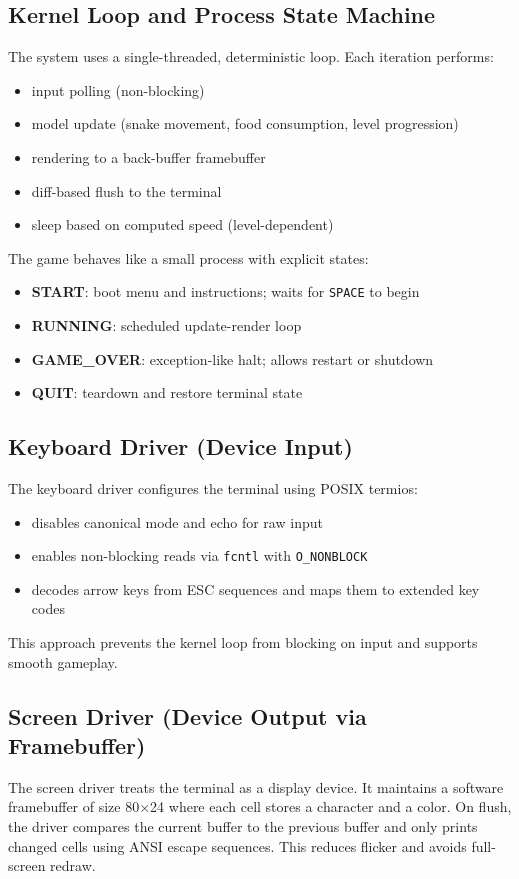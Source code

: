 \documentclass[conference]{IEEEtran}
\begin{document}
\subsection{Kernel Loop and Process State Machine}
The system uses a single-threaded, deterministic loop. Each iteration performs:
\begin{itemize}
    \item input polling (non-blocking)
    \item model update (snake movement, food consumption, level progression)
    \item rendering to a back-buffer framebuffer
    \item diff-based flush to the terminal
    \item sleep based on computed speed (level-dependent)
\end{itemize}

The game behaves like a small process with explicit states:
\begin{itemize}
    \item \textbf{START}: boot menu and instructions; waits for \texttt{SPACE} to begin
    \item \textbf{RUNNING}: scheduled update-render loop
    \item \textbf{GAME\_OVER}: exception-like halt; allows restart or shutdown
    \item \textbf{QUIT}: teardown and restore terminal state
\end{itemize}

\subsection{Keyboard Driver (Device Input)}
The keyboard driver configures the terminal using POSIX termios:
\begin{itemize}
    \item disables canonical mode and echo for raw input
    \item enables non-blocking reads via \texttt{fcntl} with \texttt{O\_NONBLOCK}
    \item decodes arrow keys from ESC sequences and maps them to extended key codes
\end{itemize}
This approach prevents the kernel loop from blocking on input and supports smooth gameplay.

\subsection{Screen Driver (Device Output via Framebuffer)}
The screen driver treats the terminal as a display device. It maintains a software framebuffer of size 80$\times$24 where each cell stores a character and a color. On flush, the driver compares the current buffer to the previous buffer and only prints changed cells using ANSI escape sequences. This reduces flicker and avoids full-screen redraw.
\end{document}
